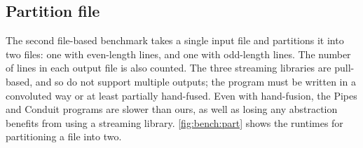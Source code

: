 \subsection{Partition file}
The second file-based benchmark takes a single input file and partitions it into two files: one with even-length lines, and one with odd-length lines.
The number of lines in each output file is also counted.
The three streaming libraries are pull-based, and so do not support multiple outputs; the program must be written in a convoluted way or at least partially hand-fused.
Even with hand-fusion, the Pipes and Conduit programs are slower than ours, as well as losing any abstraction benefits from using a streaming library.
\autoref{fig:bench:part} shows the runtimes for partitioning a file into two.


